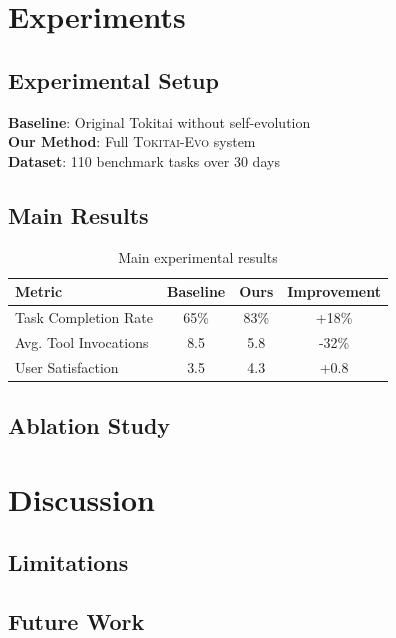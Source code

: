 \documentclass[11pt]{article}
\newcommand{\ours}{\textsc{Tokitai-Evo}\xspace}
\begin{document}
\section{Experiments}\label{sec:experiments}

\subsection{Experimental Setup}

\textbf{Baseline}: Original Tokitai without self-evolution\\
\textbf{Our Method}: Full \ours system\\
\textbf{Dataset}: 110 benchmark tasks over 30 days

\subsection{Main Results}

\begin{table}[t]
\centering
\caption{Main experimental results}
\label{tab:main-results}
\begin{tabular}{lccc}
\toprule
\textbf{Metric} & \textbf{Baseline} & \textbf{Ours} & \textbf{Improvement} \\
\midrule
Task Completion Rate & 65\% & 83\% & +18\% \\
Avg. Tool Invocations & 8.5 & 5.8 & -32\% \\
User Satisfaction & 3.5 & 4.3 & +0.8 \\
\bottomrule
\end{tabular}
\end{table}

\subsection{Ablation Study}

\section{Discussion}\label{sec:discussion}

\subsection{Limitations}

\subsection{Future Work}
\end{document}
